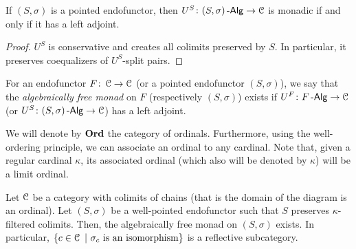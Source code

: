 \documentclass[a4paper,11pt,oneside,openany]{scrbook}
\begin{document}
\begin{lemma}
	If $(S,\sigma)$ is a pointed endofunctor, then
    $U^S\colon(S,\sigma)\operatorname{-\mathsf{Alg}}\to\operatorname{\mathcal{C}}$ is monadic if and only if it has a left
    adjoint.
\end{lemma}
\begin{proof}
	$U^S$ is conservative and creates all colimits preserved by $S$. In particular, it preserves coequalizers of $U^S$-split pairs.
\end{proof}
\begin{defn}
	For an endofunctor $F\colon\operatorname{\mathcal{C}}\to\operatorname{\mathcal{C}}$ (or a pointed endofunctor $(S,\sigma)$), we say that the \emph{algebraically free monad} on $F$ (respectively  $(S,\sigma)$) exists if $U^F\colon F\operatorname{-\mathsf{Alg}}\to\operatorname{\mathcal{C}}$ (or $U^S\colon(S,\sigma)\operatorname{-\mathsf{Alg}}\to\operatorname{\mathcal{C}}$) has a left adjoint.
\end{defn}

We will denote by $\operatorname{\mathbf{Ord}}$ the category of ordinals. Furthermore, using
the well-ordering principle, we can associate an ordinal to any cardinal.
Note that, given a regular cardinal $\kappa$, its associated ordinal
(which also will be denoted by $\kappa$) will be a limit ordinal.

\begin{thm}
	Let $\operatorname{\mathcal{C}}$ be a category with colimits of chains (that is the domain of the diagram is an ordinal). Let $(S,\sigma)$ be a well-pointed endofunctor such that $S$ preserves $\kappa$-filtered colimits. Then, the algebraically free monad on $(S,\sigma)$ exists. In particular, $\{c\in\C\ |\ \sigma_c\text{ is an isomorphism}\}$ is a reflective subcategory.
\end{thm}
\end{document}
